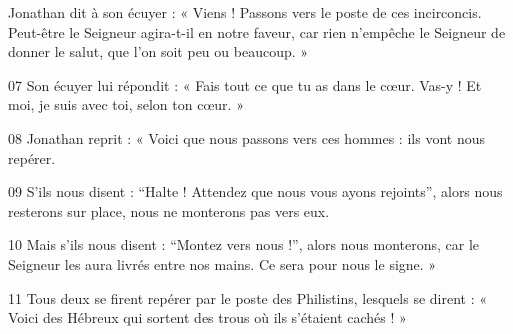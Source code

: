  Jonathan dit à son écuyer : « Viens ! Passons vers le poste de ces incirconcis. Peut-être le Seigneur agira-t-il en notre faveur, car rien n’empêche le Seigneur de donner le salut, que l’on soit peu ou beaucoup. »

07 Son écuyer lui répondit : « Fais tout ce que tu as dans le cœur. Vas-y ! Et moi, je suis avec toi, selon ton cœur. »

08 Jonathan reprit : « Voici que nous passons vers ces hommes : ils vont nous repérer.

09 S’ils nous disent : “Halte ! Attendez que nous vous ayons rejoints”, alors nous resterons sur place, nous ne monterons pas vers eux.

10 Mais s’ils nous disent : “Montez vers nous !”, alors nous monterons, car le Seigneur les aura livrés entre nos mains. Ce sera pour nous le signe. »

11 Tous deux se firent repérer par le poste des Philistins, lesquels se dirent : « Voici des Hébreux qui sortent des trous où ils s’étaient cachés ! »
